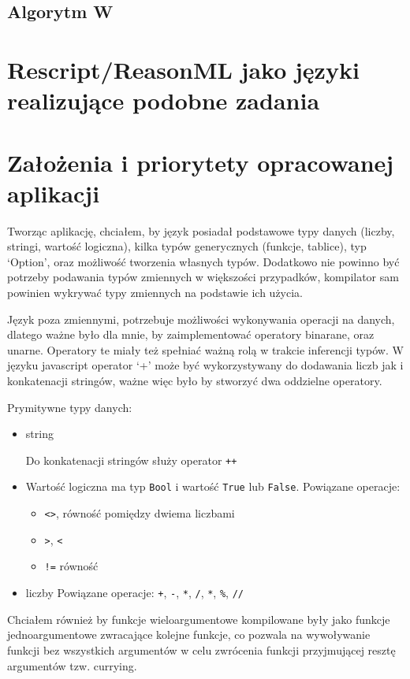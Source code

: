 \documentclass{article}
\begin{document}
\subsection{Algorytm W}
\section{Rescript/ReasonML jako języki realizujące podobne zadania}
\newpage
\section{Założenia i priorytety opracowanej aplikacji}
Tworząc aplikację, chciałem, by język posiadał podstawowe typy danych (liczby, stringi, wartość logiczna), kilka typów generycznych (funkcje, tablice), typ `Option', oraz możliwość tworzenia własnych typów.
Dodatkowo nie powinno być potrzeby podawania typów zmiennych w większości przypadków, kompilator sam powinien wykrywać typy zmiennych na podstawie ich użycia.


Język poza zmiennymi, potrzebuje możliwości wykonywania operacji na danych, dlatego ważne było dla mnie, by zaimplementować operatory binarane, oraz unarne. Operatory te miały też spełniać ważną rolą w trakcie inferencji typów. W języku javascript operator `+' może być wykorzystywany do dodawania liczb jak i konkatenacji stringów, ważne więc było by stworzyć dwa oddzielne operatory.

Prymitywne typy danych:
\begin{itemize}
  \item string
  
  Do konkatenacji stringów służy operator \lstinline!++!
  \item Wartość logiczna ma typ \lstinline!Bool! i wartość \lstinline!True! lub \lstinline!False!.
  Powiązane operacje:
    \begin{itemize}
      \item \lstinline!<>!, równość pomiędzy dwiema liczbami
      \item \lstinline!>!, \lstinline!<!
      \item \lstinline|!=| równość
    \end{itemize}
    \item liczby
    Powiązane operacje: \lstinline!+!, \lstinline!-!, \lstinline!*!, \lstinline!/!, \lstinline!*!, \lstinline!%!, \lstinline!//!
\end{itemize}


\newpage
Chciałem również by funkcje wieloargumentowe kompilowane były jako funkcje jednoargumentowe zwracające kolejne funkcje, co pozwala na wywoływanie funkcji bez wszystkich argumentów w celu zwrócenia funkcji przyjmującej resztę argumentów tzw. currying.
\end{document}
